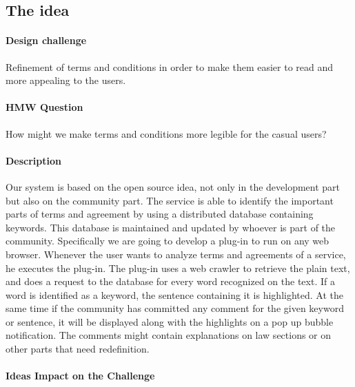 \subsection{The idea}

\paragraph{Design challenge} 

Refinement of terms and conditions in order to 
make them easier to read and more appealing to the users.

\paragraph{HMW Question} 

How might we make terms and conditions more legible 
for the casual users?

\paragraph{Description}

Our system is based on the  open source idea, not only in the development part 
but also on the community part. The service is able to identify the important 
parts of terms and agreement by using a distributed database containing keywords.
This database is maintained and updated by whoever is part of the community. 
Specifically we are going to develop a plug-in to run on any web browser.
Whenever the user wants to analyze terms and agreements of a service, he 
executes the plug-in. The plug-in uses a web crawler to retrieve the plain text, 
and does a request to the database for every word recognized on the text. If a 
word is identified as a keyword, the sentence containing it is highlighted. At 
the same time if the community has committed any comment for the given keyword 
or sentence, it will be displayed along with the highlights on a pop up bubble 
notification.
The comments might contain explanations on law sections or on other parts that 
need redefinition.

\paragraph{Ideas Impact on the Challenge}

